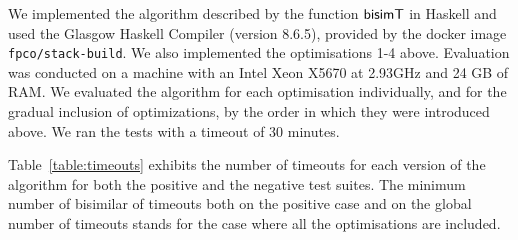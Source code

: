 
We implemented the algorithm described by the function $\mathsf{bisimT}$ 
in
Haskell and used the Glasgow Haskell Compiler (version
8.6.5), provided by the docker image
\texttt{fpco/stack-build}. We also implemented the optimisations 1-4 above.
Evaluation was conducted on a machine with
an Intel Xeon X5670 at 2.93GHz and 24 GB of RAM.
We evaluated the algorithm for each optimisation individually, and for the 
gradual inclusion of optimizations, by the order in which
they were introduced above.
We ran the tests with a timeout of 30 minutes. 

Table~\ref{table:timeouts} 
exhibits the number of timeouts for each version of the algorithm for both
the positive and the negative test suites. The minimum number of bisimilar 
of timeouts both on the positive case and on the global number of timeouts 
stands for the case where all the optimisations are included.


